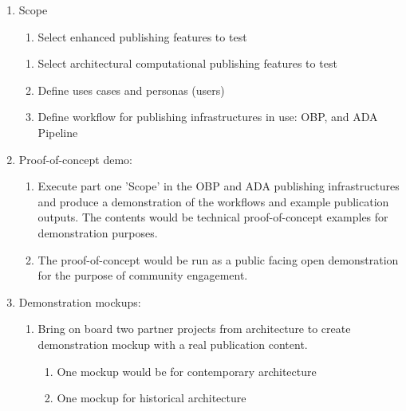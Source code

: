 \documentclass{article}
\begin{document}
\begin{enumerate}
\item Scope

\begin{enumerate}
\item Select enhanced publishing features to test


\end{enumerate}
\begin{enumerate}[start=2]
\item Select architectural computational publishing features to test


\item Define uses cases and personas (users)


\item Define workflow for publishing infrastructures in use: OBP, and ADA Pipeline


\end{enumerate}

\item Proof-of-concept demo:

\begin{enumerate}
\item Execute part one 'Scope' in the OBP and ADA publishing infrastructures and produce a demonstration of the workflows and example publication outputs. The contents would be technical proof-of-concept examples for demonstration purposes. 


\item The proof-of-concept would be run as a public facing open demonstration for the purpose of community engagement.


\end{enumerate}

\item Demonstration mockups:

\begin{enumerate}
\item Bring on board two partner projects from architecture to create demonstration mockup with a real publication content.

\begin{enumerate}
\item One mockup would be for contemporary architecture


\item One mockup for historical architecture


\end{enumerate}

\end{enumerate}

\end{enumerate}
\end{document}
